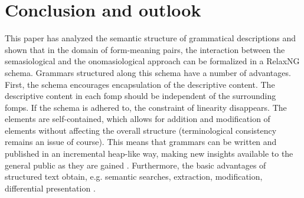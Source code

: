 \section{Conclusion and outlook}
This paper has analyzed the semantic structure of grammatical descriptions and shown that in the domain of form-meaning pairs,  the interaction between the  semasiological and the onomasiological approach  can be formalized in a RelaxNG schema. Grammars structured along this schema have a number of advantages. First, the schema encourages encapsulation of the descriptive content. The descriptive content in each fomp should be independent of the surrounding fomps. If the schema is adhered to, the constraint of linearity disappears. The elements are self-contained, which allows for addition and modification of elements without affecting the overall structure (terminological consistency remains an issue of course). This means that grammars can be written and published in an incremental heap-like way, making new insights available to the general public as they are gained \citep[cf.][]{Weber2006grow,Goodtv}. Furthermore, the basic advantages of structured text obtain, e.g. semantic searches, extraction, modification, differential presentation \citep{Maxwelltv}.


